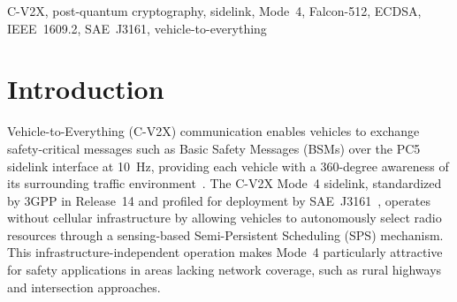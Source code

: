 \documentclass[letterpaper,journal]{IEEEtran}
\begin{document}
\begin{abstract}
Wireless connectivity, such as Cellular-Vehicle-to-Everything (C-V2X), between vehicles and transportation infrastructure promises significant roadway safety benefits by providing 360-degree views of their surroundings. However, wireless connectivity in intelligent transportation systems is vulnerable to deliberate cyber threats. Security of wireless connectivity relies on traditional cryptographic techniques as specified in the IEEE 1609.2 standard. The anticipated advent of quantum computing can compromise this cryptographic foundation. Post-quantum cryptographic (PQC) algorithms offer quantum-resistant alternatives. However, the significantly larger size of PQC signatures and public keys poses a challenge to meet communication latency for safety-critical transportation applications. This study conducts a comprehensive evaluation of standardized PQC algorithms on C-V2X sidelink performance to assess the feasibility of implementing PQC in safety-critical transportation applications. C-V2X sidelink key performance indicators (KPIs), including packet delivery ratio (PDR), end-to-end latency, channel busy ratio (CBR), and resource utilization, are compared across PQC algorithms at varying levels of service at an urban roadway intersection to confirm their applicability.

\end{abstract}

\begin{IEEEkeywords}
C-V2X, post-quantum cryptography, sidelink, Mode~4, Falcon-512, ECDSA, IEEE~1609.2, SAE~J3161, vehicle-to-everything
\end{IEEEkeywords}

\section{Introduction}
 Vehicle-to-Everything (C-V2X) communication enables vehicles to exchange safety-critical messages such as Basic Safety Messages (BSMs) over the PC5 sidelink interface at 10~Hz, providing each vehicle with a 360-degree awareness of its surrounding traffic environment~\cite{molina2017lte}. The C-V2X Mode~4 sidelink, standardized by 3GPP in Release~14 and profiled for deployment by SAE~J3161~\cite{sae_j3161}, operates without cellular infrastructure by allowing vehicles to autonomously select radio resources through a sensing-based Semi-Persistent Scheduling (SPS) mechanism. This infrastructure-independent operation makes Mode~4 particularly attractive for safety applications in areas lacking network coverage, such as rural highways and intersection approaches.
\end{document}
